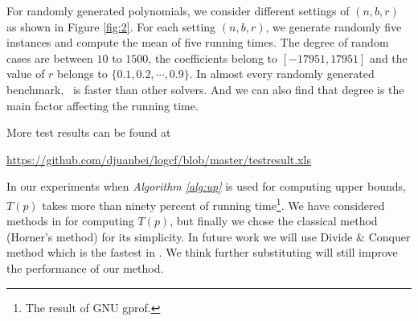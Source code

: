 %
%
%
%
%
%
%
%
%
%
%



For randomly generated polynomials, we consider different settings of
$(n,b,r)$ as shown in Figure \ref{fig:2}. For each setting $(n,b,r)$, we generate randomly five instances and  compute the mean of five running times. The degree of random cases are between $10$ to $1500$, the coefficients  belong to $[-17951,17951]$ and the value of $r$ belongs to $\{0.1,0.2,\cdots, 0.9\}$. In almost every randomly generated benchmark, \froot\  is  faster than other  solvers. And we can also  find that
degree is the main factor affecting the  running time.

More test results can be found at
	
	 \url{https://github.com/djuanbei/logcf/blob/master/testresult.xls}

In our experiments when {\em Algorithm \ref{alg:up}} is used for computing upper bounds, $T(p)$  takes  more than ninety percent of running time\footnote{The result of  GNU gprof.}.  We have considered methods in \cite{ger04} for computing $T(p)$, but finally we chose the  classical method (Horner's method) for its simplicity. In future work we will use Divide \& Conquer method which is the fastest in \cite{ger04}. We think further substituting will still improve the performance of our method.

